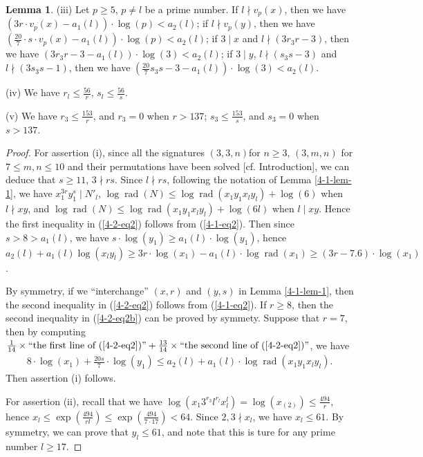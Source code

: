 \documentclass[a4paper, 12pt]{article}
\DeclareMathOperator{\rad}{\text{rad}}
\numberwithin{equation}{section}
\theoremstyle{definition}
\newtheorem{lem}[thm]{Lemma}
\begin{document}
\begin{lem}
(iii) Let $p\ge 5$, $p\neq l$ be a prime number. 
If $l \nmid v_p(x)$, then we have $(3r\cdot v_p(x) - a_1(l))\cdot  \log(p) < a_2(l)$;
if $l \nmid v_p(y)$, then we have $(\frac{20}{7}\cdot s \cdot v_p(x) - a_1(l)) \cdot  \log(p) < a_2(l)$;
if $3\mid x$ and $l\nmid (3r_3r-3)$, then we have $(3r_3r - 3 - a_1(l))\cdot  \log(3) < a_2(l)$;
if $3\mid y$, $l\nmid (s_3s-3)$ and $l\nmid (3s_3s - 1)$, then we have $(\frac{20}{7}  s_3s - 3 - a_1(l))\cdot  \log(3) < a_2(l)$.

(iv) We have $r_l \le \frac{56}{r}$, $s_l \le \frac{56}{s}$.

(v) We have $r_3 \le \frac{153}{r}$, and $r_3 = 0$ when $r > 137$;
$s_3 \le \frac{153}{s}$, and $s_3 = 0$ when $s > 137$.
\end{lem}

\begin{proof}
For assertion (i), since all the signatures $(3,3,n)$for $n\ge 3$, $(3,m,n)$ for $7\le m,n \le 10$ and their permutations have been solved [cf. Introduction], we can deduce that $s\ge 11$, $3\nmid rs$. 
Since $l\nmid rs$, following the notation of Lemma \ref{4-1-lem-1}, we have $x_1^{3r} y_1^s \mid N'_l$, $\log\rad(N) \le \log\rad(x_1 y_1 x_l y_l) + \log(6)$ when $l\nmid xy$, and $\log\rad(N) \le \log\rad(x_1 y_1 x_l y_l) + \log(6l)$ when $l\mid xy$. Hence the first inequality in (\ref{4-2-eq2}) follows from (\ref{4-1-eq2}). Then since $s > 8 > a_1(l)$, we have $s\cdot \log(y_1) \ge a_1(l) \cdot \log(y_1)$, hence $a_2(l) +  a_1(l) \log(x_l y_l) \ge 3r \cdot \log(x_1) - a_1(l) \cdot \log\rad(x_1) \ge (3r-7.6) \cdot \log(x_1)$.

By symmetry, if we ``interchange''  $(x,r)$ and $(y,s)$ in Lemma \ref{4-1-lem-1}, then the second inequality in (\ref{4-2-eq2}) follows from (\ref{4-1-eq2}). If $r\ge 8$, then the second inequality in (\ref{4-2-eq2b}) can be proved by symmety. Suppose that $r=7$, then by computing $\frac{1}{14}\times \text{``the first line of  (\ref{4-2-eq2})''} + \frac{13}{14}\times \text{``the second line of  (\ref{4-2-eq2})''}$, 
we have \small\begin{align*}
8 \cdot \log(x_1) + \frac{20s}{7} \cdot \log(y_1) \le a_2(l) + a_1(l)\cdot \log\rad(x_1 y_1 x_l y_l).
\end{align*}\normalsize
Then assertion (i) follows.

For assertion (ii), recall that we have $\log(x_1 3^{r_3} l^{r_l }x_l^l) = \log(x_{(2)})\le \frac{494}{r}$, hence $x_l \le \exp(\frac{494}{rl} ) \le \exp(\frac{494}{7\cdot 17} ) < 64$. Since $2,3\nmid x_l$, we have $x_l \le 61$.
By symmetry, we can prove that $y_l \le 61$, and note that this is ture for any prime number $l\ge 17$.


\end{proof}
\end{document}
